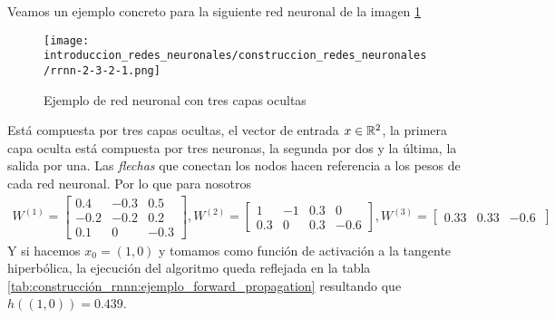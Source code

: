 Veamos un ejemplo concreto para la siguiente red neuronal de la imagen \ref{img:construccion_rrnn:rrnn-2-3-2-1}
\begin{figure}[h!]
    \texttt{[image: introduccion\_redes\_neuronales/construccion\_redes\_neuronales/rrnn-2-3-2-1.png]}
    \caption{Ejemplo de red neuronal con tres capas ocultas}
    \label{img:construccion_rrnn:rrnn-2-3-2-1}
\end{figure} 
Está compuesta por tres capas ocultas, el vector de entrada $x \in \mathbb{R}^2$, 
la primera capa oculta está compuesta por tres neuronas, la segunda por dos y la última, la salida por una. 
Las \textit{flechas} que conectan los nodos hacen referencia a los pesos de cada red neuronal. Por lo que para nosotros 
\begin{align}
    W^{(1)} = 
    \begin{bmatrix}
        0.4 & -0.3 & 0.5\\
        -0.2 & -0.2 & 0.2\\
        0.1 & 0 & -0.3
    \end{bmatrix} ,
    W^{(2)} = 
    \begin{bmatrix}
        1 & -1 & 0.3 & 0\\
        0.3& 0 & 0.3 & -0.6 
    \end{bmatrix} ,
    W^{(3)} = 
    \begin{bmatrix}
        0.33 & 0.33 & -0.6 \
    \end{bmatrix} 
\end{align}
Y si hacemos $x_0 = (1,0)$ y tomamos como función de activación
a la tangente hiperbólica, la ejecución del algoritmo queda reflejada en la tabla \ref{tab:construcción_rnnn:ejemplo_forward_propagation} resultando que 
$h((1,0)) = 0.439$.
